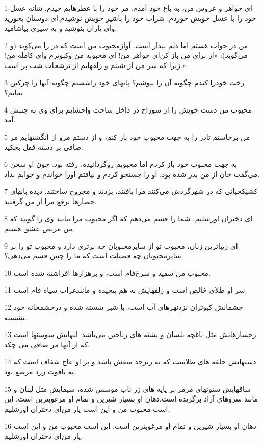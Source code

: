 \par 1 ای خواهر و عروس من، به باغ خود آمدم. مر خود را با عطرهایم چیدم. شانه عسل خود را با عسل خویش خوردم. شراب خود را باشیر خویش نوشیدم.ای دوستان بخورید و‌ای یاران بنوشید و به سیری بیاشامید.
\par 2 من در خواب هستم اما دلم بیدار است. آوازمحبوب من است که در را می‌کوبد (و می‌گوید): «از برای من باز کن‌ای خواهر من! ای محبوبه من وکبوترم و‌ای کامله من! زیرا که سر من از شبنم و زلفهایم از ترشحات شب پر است.»
\par 3 رخت خودرا کندم چگونه آن را بپوشم؟ پایهای خود راشستم چگونه آنها را چرکین نمایم؟
\par 4 محبوب من دست خویش را از سوراخ در داخل ساخت واحشایم برای وی به جنبش آمد.
\par 5 من برخاستم تادر را به جهت محبوب خود باز کنم، و از دستم مرو از انگشتهایم مر صافی بر دسته قفل بچکید.
\par 6 به جهت محبوب خود باز کردم اما محبوبم روگردانیده، رفته بود. چون او سخن می‌گفت جان از من بدر شده بود. او را جستجو کردم و نیافتم اورا خواندم و جوابم نداد.
\par 7 کشیکچیانی که در شهرگردش می‌کنند مرا یافتند، بزدند و مجروح ساختند. دیده بانهای حصارها برقع مرا از من گرفتند.
\par 8 ‌ای دختران اورشلیم، شما را قسم می‌دهم که اگر محبوب مرا بیابید وی را گویید که من مریض عشق هستم.
\par 9 ‌ای زیباترین زنان، محبوب تو از سایرمحبوبان چه برتری دارد و محبوب تو را بر سایرمحبوبان چه فضیلت است که ما را چنین قسم می‌دهی؟
\par 10 محبوب من سفید و سرخ‌فام است، و برهزارها افراشته شده است.
\par 11 سر او طلای خالص است و زلفهایش به هم پیچیده و مانندغراب سیاه فام است.
\par 12 چشمانش کبوتران نزدنهرهای آب است، با شیر شسته شده و درچشمخانه خود نشسته.
\par 13 رخسارهایش مثل باغچه بلسان و پشته های ریاحین می‌باشد. لبهایش سوسنها است که از آنها مر صافی می چکد.
\par 14 دستهایش حلقه های طلاست که به زبرجد منقش باشد و بر او عاج شفاف است که به یاقوت زرد مرصع بود.
\par 15 ساقهایش ستونهای مرمر بر پایه های زر ناب موسس شده، سیمایش مثل لبنان و مانند سروهای آزاد برگزیده است.دهان او بسیار شیرین و تمام او مرغوبترین است. این است محبوب من و این است یار من‌ای دختران اورشلیم.
\par 16 دهان او بسیار شیرین و تمام او مرغوبترین است. این است محبوب من و این است یار من‌ای دختران اورشلیم.
 
